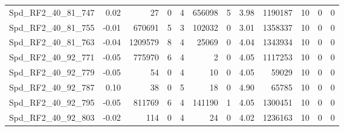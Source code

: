 \begin{longtable}[c]{@{}lrrrrrrrrrrr@{}}
Spd\_RF2\_40\_81\_747         & 0.02                   & 27                      & 0                       & 4                      & 656098                  & 5                       & 3.98                    & 1190187                  & 10                       & 0                        & 0                        \\
Spd\_RF2\_40\_81\_755         & -0.01                  & 670691                  & 5                       & 3                      & 102032                  & 0                       & 3.01                    & 1358337                  & 10                       & 0                        & 0                        \\
Spd\_RF2\_40\_81\_763         & -0.04                  & 1209579                 & 8                       & 4                      & 25069                   & 0                       & 4.04                    & 1343934                  & 10                       & 0                        & 0                        \\
Spd\_RF2\_40\_92\_771         & -0.05                  & 775970                  & 6                       & 4                      & 2                       & 0                       & 4.05                    & 1117253                  & 10                       & 0                        & 0                        \\
Spd\_RF2\_40\_92\_779         & -0.05                  & 54                      & 0                       & 4                      & 10                      & 0                       & 4.05                    & 59029                    & 10                       & 0                        & 0                        \\
Spd\_RF2\_40\_92\_787         & 0.10                   & 38                      & 0                       & 5                      & 18                      & 0                       & 4.90                    & 65785                    & 10                       & 0                        & 0                        \\
Spd\_RF2\_40\_92\_795         & -0.05                  & 811769                  & 6                       & 4                      & 141190                  & 1                       & 4.05                    & 1300451                  & 10                       & 0                        & 0                        \\
Spd\_RF2\_40\_92\_803         & -0.02                  & 114                     & 0                       & 4                      & 24                      & 0                       & 4.02                    & 1236163                  & 10                       & 0                        & 0                        \\

\end{longtable}
